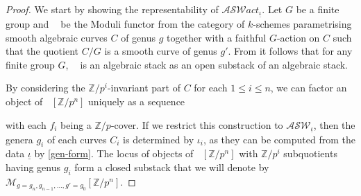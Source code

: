 \documentclass{compositio}
\newcommand{\huy}[1]{\todo[color=yellow]{HD: #1}}
\theoremstyle{remark}
\theoremstyle{remark}
\DeclareMathOperator{\cov}{cov}
\DeclareMathOperator{\MggpG}{\mathcal{M}_{g,g',k}[G]}
\DeclareMathOperator{\Mgg}{\mathcal{M}_{g,g',k}}
\begin{document}
\begin{proof}
We start by showing the representability of $\mathcal{ASW}act_{\underline{\iota}}$.
Let $G$ be a finite group and $\MggpG$ be the 
Moduli functor from the category of $k$-schemes parametrising smooth algebraic curves $C$ of genus $g$ together with a faithful $G$-action on $C$ such that the quotient $C/G$ is a smooth curve of genus $g'$. From \cite[Proposition 2.7]{MR2223481} it follows that for any finite group $G$,  $\MggpG$ is an algebraic stack as an open substack of an algebraic stack.



By considering the $\mathbb{Z}/p^{i}$-invariant part of $C$ for each $1 \leq i \leq n$,
we can factor an object of $\Mgg[\mathbb{Z}/p^n]$ uniquely as a sequence 
\begin{center}
\end{center}
with each $f_i$ being a $\mathbb{Z}/p$-cover. If we restrict this construction to $\mathcal{ASW}_{\underline{\iota}}$, then the genera $g_i$ of each curves $C_i$ is determined by $\iota_i$, 
as they can be computed from the data $\underline{\iota}$ by \ref{gen-form}. The locus of objects of $\Mgg[\mathbb{Z}/p^n]$ with $\mathbb{Z}/p^i$ subquotients having genus $g_i$ form a closed substack that we will denote by $\mathcal{M}_{g=g_n, g_{n-1}, \dots, g'=g_0}[\mathbb{Z}/p^n]$. 


\end{proof}
\end{document}
